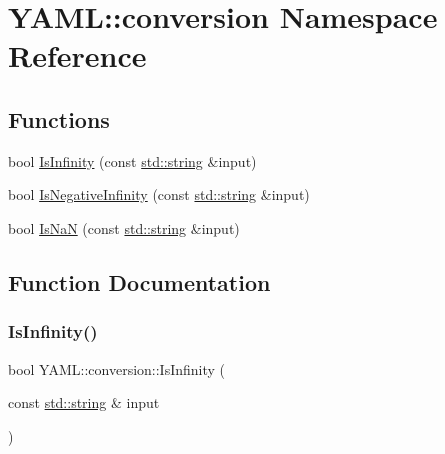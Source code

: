 \hypertarget{namespace_y_a_m_l_1_1conversion}{}\section{Y\+A\+ML\+::conversion Namespace Reference}
\label{namespace_y_a_m_l_1_1conversion}
\subsection*{Functions}
\begin{DoxyCompactItemize}
\item 
bool \mbox{\hyperlink{namespace_y_a_m_l_1_1conversion_abdfeb83d63be37e4500bd46cc91886b4}{Is\+Infinity}} (const \mbox{\hyperlink{glad_8h_ac83513893df92266f79a515488701770}{std\+::string}} \&input)
\item 
bool \mbox{\hyperlink{namespace_y_a_m_l_1_1conversion_aeee2784a85a229fc7792b257fd8f6087}{Is\+Negative\+Infinity}} (const \mbox{\hyperlink{glad_8h_ac83513893df92266f79a515488701770}{std\+::string}} \&input)
\item 
bool \mbox{\hyperlink{namespace_y_a_m_l_1_1conversion_a18c1203ebbec9aa7332b1c517e0986d3}{Is\+NaN}} (const \mbox{\hyperlink{glad_8h_ac83513893df92266f79a515488701770}{std\+::string}} \&input)
\end{DoxyCompactItemize}


\subsection{Function Documentation}
\mbox{\label{namespace_y_a_m_l_1_1conversion_abdfeb83d63be37e4500bd46cc91886b4}} 
\subsubsection{\texorpdfstring{IsInfinity()}{IsInfinity()}}
{\footnotesize\ttfamily bool Y\+A\+M\+L\+::conversion\+::\+Is\+Infinity (\begin{DoxyParamCaption}\item[{const \mbox{\hyperlink{glad_8h_ac83513893df92266f79a515488701770}{std\+::string}} \&}]{input }\end{DoxyParamCaption})\hspace{0.3cm}{\ttfamily [inline]}}



